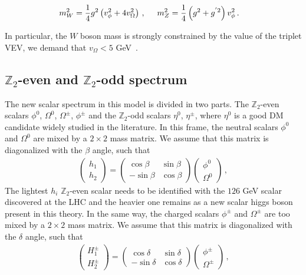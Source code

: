 \documentclass[12pt,letterpaper]{article}
\begin{document}
\begin{align}
\label{eq:mW-mZ}
m_W^2 &= \dfrac{1}{4}g^2\left(v_{\phi}^2+4v_{\Omega}^2\right)\,,\hspace{0.5 cm} 
m_Z^2=\dfrac{1}{4}\left(g^2+g^{'2}\right)v_{\phi}^2\,.
\end{align}

In particular, the $W$ boson mass is strongly constrained by the value of the triplet VEV, we demand that $v_{\Omega}< 5$ GeV~\cite{Agashe:2014kda}.

\subsection{$\mathbb{Z}_2$-even and $\mathbb{Z}_2$-odd spectrum}
The new scalar spectrum in this model is divided in two parts. The $\mathbb{Z}_2$-even scalars $\phi^0$, $\Omega^0$, $\Omega^{\pm}$, $\phi^{\pm}$ and the $\mathbb{Z}_2$-odd scalars $\eta^0$, $\eta^{\pm}$, where $\eta^0$ is a good DM candidate widely studied in the literature.
%
In this frame, the neutral scalars $\phi^0$ and $\Omega^0$ are mixed by a $2\times 2$ mass matrix. We assume that this matrix is diagonalized with the $\beta$ angle, such that
%
\begin{align}
\label{eq:beta-mixing}
\begin{pmatrix}
h_1 \\ h_2 
\end{pmatrix}=
\begin{pmatrix}
\cos\beta & \sin\beta \\
-\sin\beta & \cos\beta
\end{pmatrix}
\begin{pmatrix}
\phi^0 \\ \Omega^0 
\end{pmatrix}\,,
\end{align} 
%
The lightest $h_i$ $\mathbb{Z}_2$-even scalar needs to be identified with the $126$ GeV scalar discovered at the LHC and the heavier one remains as a new scalar higgs boson present in this theory.  
%
In the same way, the charged scalars $\phi^{\pm}$ and $\Omega^{\pm}$ are too mixed by a $2\times 2$ mass matrix. We assume that this matrix is diagonalized with the $\delta$ angle, such that
%
\begin{align}
\label{eq:delta-mixing}
\begin{pmatrix}
H_1^{\pm} \\ H_2^{\pm} 
\end{pmatrix}=
\begin{pmatrix}
\cos\delta & \sin\delta \\
-\sin\delta & \cos\delta
\end{pmatrix}
\begin{pmatrix}
\phi^{\pm} \\ \Omega^{\pm} 
\end{pmatrix}\,,
\end{align} 
\end{document}
